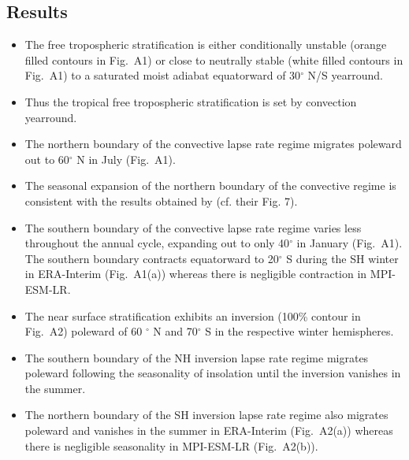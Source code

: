 \documentclass{ametsocV5}
\begin{document}
\subsection{Results}
\begin{itemize}
  \item The free tropospheric stratification is either conditionally unstable (orange filled contours in Fig.~A1) or close to neutrally stable (white filled contours in Fig.~A1) to a saturated moist adiabat equatorward of 30$^{\circ}$ N/S yearround.
  \item Thus the tropical free tropospheric stratification is set by convection yearround.
  \item The northern boundary of the convective lapse rate regime migrates poleward out to 60$^{\circ}$ N in July (Fig.~A1).
  \item The seasonal expansion of the northern boundary of the convective regime is consistent with the results obtained by \cite{stone1979} (cf. their Fig. 7).
  \item The southern boundary of the convective lapse rate regime varies less throughout the annual cycle, expanding out to only 40$^{\circ}$ in January (Fig.~A1). The southern boundary contracts equatorward to 20$^{\circ}$ S during the SH winter in ERA-Interim (Fig.~A1(a)) whereas there is negligible contraction in MPI-ESM-LR.
  \item The near surface stratification exhibits an inversion (100\% contour in Fig.~A2) poleward of 60 $^{\circ}$ N and 70$^{\circ}$ S in the respective winter hemispheres.
  \item The southern boundary of the NH inversion lapse rate regime migrates poleward following the seasonality of insolation until the inversion vanishes in the summer.
        \item The northern boundary of the SH inversion lapse rate regime also migrates poleward and vanishes in the summer in ERA-Interim (Fig.~A2(a)) whereas there is negligible seasonality in MPI-ESM-LR (Fig.~A2(b)).
\end{itemize}


\end{document}
